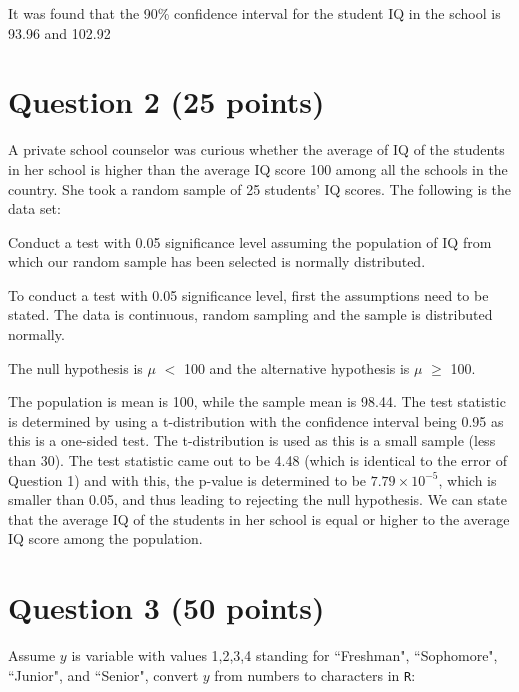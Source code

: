 \documentclass[12pt,letterpaper]{article}
\begin{document}
It was found that the 90\% confidence interval for the student IQ in the school is 93.96 and 102.92

\vspace{1cm}
\section*{Question 2 (25 points)}
A private school counselor was curious  whether  the average of IQ of the students in her school is higher than the average IQ score 100 among all the schools in the country. She took a random sample of 25 students' IQ scores. The following is the data set:
\vspace{.5cm}
  
\vspace{.5cm}

\noindent Conduct a test with 0.05 significance level assuming the population of IQ from which our random sample has been selected is normally distributed. 
 

 
To conduct a test with 0.05 significance level, first the assumptions need to be stated. 
The data is continuous, random sampling and the sample is distributed normally. 

The null hypothesis is $\mu$ $<$ 100 and the alternative hypothesis is $\mu$ $\geq$ 100. 
  
The population is mean is 100, while the sample mean is 98.44. 
The test statistic is determined by using a t-distribution with the confidence interval being 0.95 as this is a one-sided test. The t-distribution is used as this is a small sample (less than 30). The test statistic came out to be 4.48 (which is identical to the error of Question 1) and with this, the p-value is determined to be $7.79\times10^{-5}$, which is smaller than 0.05, and thus leading to rejecting the null hypothesis. 
We can state that the average IQ of the students in her school is equal or higher to the average IQ score among the population. 

 
\vspace{1cm}
	\section*{Question 3 (50 points)}
Assume $y$ is variable with values 1,2,3,4 standing for ``Freshman", ``Sophomore", ``Junior", and ``Senior", convert $y$ from numbers to characters in \texttt{R}:
\vspace{.5cm}
  
\vspace{.5cm}
\end{document}
